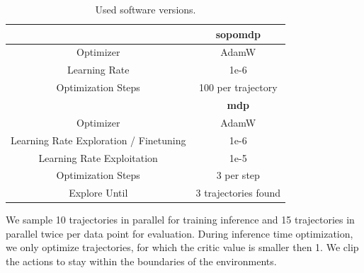 \begin{table}[H]
    \centering
    \begin{tabular}{|c|c|}
    \hline
    {} & \textbf{\ac{sopomdp}} \\
    \hline\hline
    Optimizer & AdamW \\
    \hline
    Learning Rate & 1e-6 \\
    \hline
    Optimization Steps & 100 per trajectory\\
    \hline\hline
    {} & \textbf{\ac{mdp}}  \\
    \hline\hline
    Optimizer & AdamW \\
    \hline
    Learning Rate Exploration / Finetuning & 1e-6 \\
    \hline
    Learning Rate Exploitation & 1e-5 \\
    \hline
    Optimization Steps & 3 per step\\
    \hline
    Explore Until & 3 trajectories found\\
    \hline
    \end{tabular}
    \caption{Used software versions.}
    \label{tab:inference_parameters}
\end{table}

We sample 10 trajectories in parallel for training inference and 15 trajectories in parallel twice per data point for evaluation. During inference time 
optimization, we only optimize trajectories, for which the critic value is smaller then 1. We clip the actions to stay within the boundaries of the environments.\\


